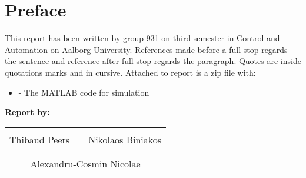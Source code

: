 \chapter*{Preface}
This report has been written by group 931 on third semester in Control and Automation on Aalborg University.
References made before a full stop regards the sentence and reference after full stop regards the paragraph. Quotes are inside quotations marks and in cursive.
Attached to report is a zip file with:
\begin{itemize}
	\item - The MATLAB code for simulation
\end{itemize}
\vspace{2cm}

\textbf{Report by:}\\
\vspace{-5pt}
\begin{table}[H]
	\centering
	\begin{tabular}{c c c}
		\underline{\phantom{JAERJAERJAERJAERGO}} & \phantom{cookies} & \underline{\phantom{JAERJAERJAERJAERGO}} \\
		 Thibaud Peers		& \phantom{cookies} &  Nikolaos Biniakos	\\
		&&\\
		\multicolumn{3}{c}{\underline{\phantom{JAERJAERJAERJAERGO}}}\\
		\multicolumn{3}{c}{Alexandru-Cosmin Nicolae}\\				
						
	\end{tabular}
\end{table}


\pagebreak
